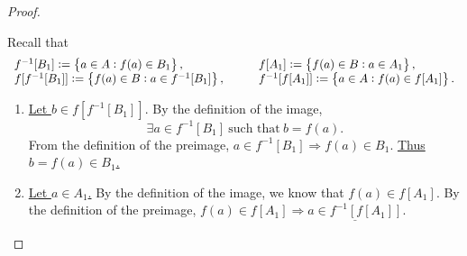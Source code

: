 \documentclass[11pt,openany]{article}
\begin{document}
\begin{proof}
\textcolor{gray!50!white}{
	Recall that \[\begin{array}{ll}
		f^{-1}[B_1]:=\set{a\in A:f(a)\in B_1}, &\quad\quad f[A_1]:=\set{f(a)\in B:a\in A_1}, \\
		f[f^{-1}[B_1]]:=\set{f(a)\in B:a \in f^{-1}[B_1]}, &\quad\quad f^{-1}[f[A_1]]:=\set{a\in A:f(a)\in f[A_1]}.
	\end{array}\]\begin{enumerate}[(1)]
		\item \underline{Let $b \in f[f^{-1}[B_1]]$}. By the definition of the image, \[
		\exists a\in f^{-1}[B_1]\ \text{such that}\ b = f(a).
		\] From the definition of the preimage, $a\in f^{-1}[B_1]\Rightarrow f(a)\in B_1$. \underline{Thus $b=f(a)\in B_1$.}
		\vspace{12pt}
		\item \underline{Let $a\in A_1$.} By the definition of the image, we know that $f(a)\in f[A_1]$. By the definition of the preimage, $f(a)\in f[A_1]\Rightarrow \underline{a\in f^{-1}[f[A_1]]}$.
	\end{enumerate}}
\end{proof}
\end{document}
